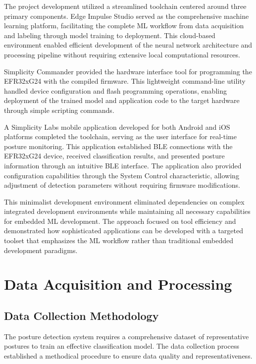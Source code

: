 \documentclass[
  9pt,
  letterpaper,
  abstract,
  titlepage]{scrbook}
\begin{document}
The project development utilized a streamlined toolchain centered around
three primary components. Edge Impulse Studio served as the
comprehensive machine learning platform, facilitating the complete ML
workflow from data acquisition and labeling through model training to
deployment. This cloud-based environment enabled efficient development
of the neural network architecture and processing pipeline without
requiring extensive local computational resources.

Simplicity Commander provided the hardware interface tool for
programming the EFR32xG24 with the compiled firmware. This lightweight
command-line utility handled device configuration and flash programming
operations, enabling deployment of the trained model and application
code to the target hardware through simple scripting commands.

A Simplicity Labs mobile application developed for both Android and iOS
platforms completed the toolchain, serving as the user interface for
real-time posture monitoring. This application established BLE
connections with the EFR32xG24 device, received classification results,
and presented posture information through an intuitive BLE interface.
The application also provided configuration capabilities through the
System Control characteristic, allowing adjustment of detection
parameters without requiring firmware modifications.

This minimalist development environment eliminated dependencies on
complex integrated development environments while maintaining all
necessary capabilities for embedded ML development. The approach focused
on tool efficiency and demonstrated how sophisticated applications can
be developed with a targeted toolset that emphasizes the ML workflow
rather than traditional embedded development paradigms.

\section{Data Acquisition and
Processing}\label{data-acquisition-and-processing}

\subsection{Data Collection
Methodology}\label{data-collection-methodology}

The posture detection system requires a comprehensive dataset of
representative postures to train an effective classification model. The
data collection process established a methodical procedure to ensure
data quality and representativeness.
\end{document}
